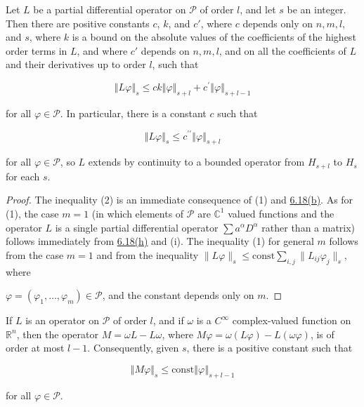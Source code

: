 \begin{proposition}\label{thm:6.25}
Let $L$ be a partial differential operator on $\mathcal{P}$ of order $l$, and let $s$ be an integer. Then there are positive constants $c$, $k$, and $c'$, where $c$ depends only on $n, m, l$, and $s$, where $k$ is a bound on the absolute values of the coefficients of the highest order terms in $L$, and where $c'$ depends on $n, m, l$, and on all the coefficients of $L$ and their derivatives up to order $l$, such that

\begin{equation}
\tag{1}\label{eq:6.25:1}
\left\Vert{L\varphi}\right\Vert_{s}\leq c k\left\Vert{\varphi}\right\Vert_{s+l}+c^{\prime}\left\Vert{\varphi}\right\Vert_{s+l-1}
\end{equation}

for all $\varphi \in \mathcal{P}$. In particular, there is a constant $c$ such that

\begin{equation}
\tag{2}\label{eq:6.25:2}
\left\Vert L\varphi\right\Vert_{s}\leq c^{\prime\prime}\left\Vert\varphi\right\Vert_{s+l}
\end{equation}

for all $\varphi \in \mathcal{P}$, so $L$ extends by continuity to a bounded operator from $H_{s+l}$ to $H_{s}$ for each $s$.

\end{proposition}

\begin{proof}
The inequality (2) is an immediate consequence of (1) and \hyperref[thm:6.18]{6.18(b)}. As for (1), the case $m=1$ (in which elements of $\mathcal{P}$ are $\mathbb{C}^1$ valued functions and the operator $L$ is a single partial differential operator $\sum a^{\alpha} D^{\alpha}$ rather than a matrix) follows immediately from \hyperref[thm:6.18]{6.18(h)} and (i). The inequality (1) for general $m$ follows from the case $m=1$ and from the inequality $\|L\varphi\|_s \leq \mathrm{const}\sum_{i,j} \|L_{ij}\varphi_j\|_s$, where

$ \varphi = (\varphi_1, \ldots, \varphi_m) \in \mathcal{P} $, and the constant depends only on  $ m $.

\end{proof}

\begin{remarks}\label{thm:6.26}
If $L$ is an operator on $\mathcal{P}$ of order $l$, and if $\omega$ is a $C^\infty$ complex-valued function on $\mathbb{R}^n$, then the operator $M = \omega L - L\omega$, where $M\varphi = \omega(L\varphi) - L(\omega\varphi)$, is of order at most $l-1$. Consequently, given $s$, there is a positive constant such that

\begin{equation}
\tag{1}\label{eq:6.26:1}
\left\Vert M\varphi\right\Vert_{s}\leq\mathrm{const}\left\Vert\varphi\right\Vert_{s+l-1}
\end{equation}

for all  $ \varphi \in \mathcal{P} $.

\end{remarks}

